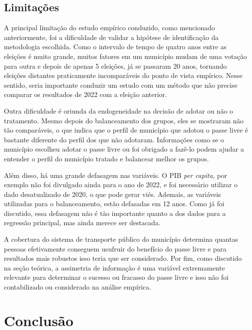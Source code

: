 \subsection{Limitações}

A principal limitação do estudo empírico conduzido, como mencionado anteriormente, foi a dificuldade de validar a hipótese de identificação da metodologia escolhida. Como o intervalo de tempo de quatro anos entre as eleições é muito grande, muitos fatores em um município mudam de uma votação para outra e depois de apenas 5 eleições, já se passaram 20 anos, tornando eleições distantes praticamente incomparáveis do ponto de vista empírico. Nesse sentido, seria importante conduzir um estudo com um método que não precise comparar os resultados de 2022 com a eleição anterior.

Outra dificuldade é oriunda da endogeneidade na decisão de adotar ou não o tratamento. Mesmo depois do balanceamento dos grupos, eles se mostraram não tão comparáveis, o que indica que o perfil de município que adotou o passe livre é bastante diferente do perfil dos que não adotaram. Informações como se o município escolheu adotar o passe livre ou foi obrigado a fazê-lo podem ajudar a entender o perfil do município tratado e balancear melhor os grupos.

Além disso, há uma grande defasagem nas variáveis. O PIB \textit{per capita}, por exemplo não foi divulgado ainda para o ano de 2022, e foi necessário utilizar o dado desatualizado de 2020, o que pode gerar viés. Ademais, as variáveis utilizadas para o balanceamento, estão defasadas em 12 anos. Como já foi discutido, essa defasagem não é tão importante quanto a dos dados para a regressão principal, mas ainda merece ser destacada.

A cobertura do sistema de transporte público do município determina quantas pessoas efetivamente conseguem usufruir do benefício do passe livre e para resultados mais robustos isso teria que ser considerado. Por fim, como discutido na seção teórica, a assimetria de informação é uma variável extremamente relevante para determinar o sucesso ou fracasso do passe livre e isso não foi contabilizado ou considerado na análise empírica. 

\section{Conclusão}

